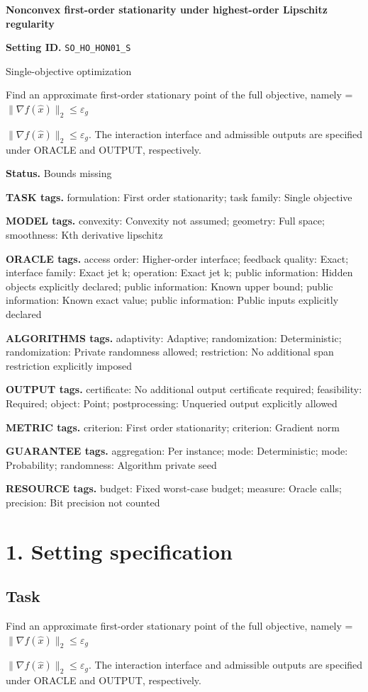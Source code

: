 \documentclass[10pt,a4paper]{article}
\newcommand{\AtlasMath}[1]{\par\begingroup\centering\setbox0=\hbox{$\displaystyle #1$}\ifdim\wd0>1.4\linewidth\typeout{ATLAS WIDE FORMULA: \the\wd0}\fi\ifdim\wd0>\linewidth\resizebox{\linewidth}{!}{\box0}\else\box0\fi\par\endgroup}
\newcommand{\AtlasInlineMath}[1]{\begingroup\setbox0=\hbox{$#1$}\ifdim\wd0>.4\linewidth\endgroup\AtlasMath{#1}\else\endgroup$#1$\fi}
\begin{document}
\raggedright

{\LARGE\bfseries\sffamily\color{AtlasNavy} Nonconvex first-order stationarity under highest-order Lipschitz regularity\par}\vspace{5pt}
\textbf{Setting ID.} \texttt{SO\_\allowbreak{}HO\_\allowbreak{}HON01\_\allowbreak{}S}

Single-objective optimization

Find an approximate first-order stationary point of the full objective, namely \AtlasInlineMath{\|\nabla f(\widehat{x})\|_2\le\varepsilon_g}. The interaction interface and admissible outputs are specified under ORACLE and OUTPUT, respectively.

\textbf{Status.} Bounds missing

\textbf{TASK tags.} formulation: First order stationarity; task family: Single objective

\textbf{MODEL tags.} convexity: Convexity not assumed; geometry: Full space; smoothness: Kth derivative lipschitz

\textbf{ORACLE tags.} access order: Higher-order interface; feedback quality: Exact; interface family: Exact jet k; operation: Exact jet k; public information: Hidden objects explicitly declared; public information: Known upper bound; public information: Known exact value; public information: Public inputs explicitly declared

\textbf{ALGORITHMS tags.} adaptivity: Adaptive; randomization: Deterministic; randomization: Private randomness allowed; restriction: No additional span restriction explicitly imposed

\textbf{OUTPUT tags.} certificate: No additional output certificate required; feasibility: Required; object: Point; postprocessing: Unqueried output explicitly allowed

\textbf{METRIC tags.} criterion: First order stationarity; criterion: Gradient norm

\textbf{GUARANTEE tags.} aggregation: Per instance; mode: Deterministic; mode: Probability; randomness: Algorithm private seed

\textbf{RESOURCE tags.} budget: Fixed worst-case budget; measure: Oracle calls; precision: Bit precision not counted

\section{1. Setting specification}
\subsection{Task}
Find an approximate first-order stationary point of the full objective, namely \AtlasInlineMath{\|\nabla f(\widehat{x})\|_2\le\varepsilon_g}. The interaction interface and admissible outputs are specified under ORACLE and OUTPUT, respectively.
\end{document}
